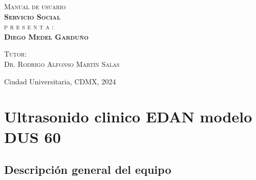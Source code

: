 \documentclass[letterpaper,12pt,oneside]{book}
\begin{document}
\begin{titlepage}
\begin{minipage}[c][0.81\textheight][t]{0.75\textwidth}
\begin{center}
                \vspace{2cm}            

                \textsc{\large Manual de usuario }\\[1.5cm]

                \textbf{\textsc{\Large Servicio Social}}\\[2 cm]
                \textsc{\Large p r e s e n t a :}\\[0.5cm]
                \textbf{\textsc{\large {Diego Medel Garduño}}}\\[2cm]          

                \vspace{0.5cm}

                {\large\scshape Tutor:\\[0.3cm] {Dr. Rodrigo Alfonso Martín Salas}}\\[.2in]

                \vspace{0.5cm}

                \large{Ciudad Universitaria, CDMX,}{ }{2024}
            \end{center}
        \end{minipage}
    \end{titlepage}




\tableofcontents
\mainmatter

\chapter{Ultrasonido clinico EDAN modelo DUS 60}

\section{Descripción general del equipo}
\end{document}
